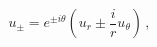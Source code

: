 \begin{equation}
u_\pm = e^{\pm i\theta} \left( u_r \pm \frac ir u_\theta \right)\,,
\label{pmrt}
\end{equation}

